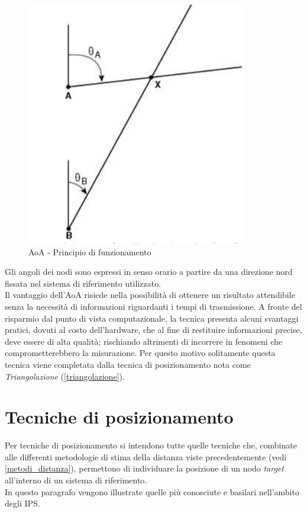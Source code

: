 \begin{figure}[H]  
	\centering 
	\includegraphics[scale=0.8]{ContestoApplicativo/aoa.png}
	\caption{AoA - Principio di funzionamento }
	\label{fig:AoA}
\end{figure}
Gli angoli dei nodi sono espressi in senso orario a partire da una direzione nord fissata nel sistema di riferimento utilizzato.\\
Il vantaggio dell’AoA risiede nella possibilità di ottenere un risultato attendibile senza la necessità di informazioni riguardanti i tempi di trasmissione. A fronte del risparmio dal punto di vista computazionale, la tecnica presenta alcuni svantaggi pratici, dovuti al costo dell’hardware, che al fine di restituire informazioni precise, deve essere di alta qualità; rischiando altrimenti di incorrere in fenomeni che comprometterebbero la misurazione. Per questo motivo solitamente questa tecnica viene completata dalla tecnica di posizionamento nota come \textit{Triangolazione} (\ref{triangolazione}).


\section{Tecniche di posizionamento}
Per tecniche di posizionamento si intendono tutte quelle tecniche che, combinate alle differenti metodologie di stima della distanza viste precedentemente (vedi \ref{metodi_distanza}), permettono di individuare la posizione di un nodo \textit{target} all'interno di un sistema di riferimento.\\
In questo paragrafo vengono illustrate quelle più conosciute e basilari nell'ambito degli IPS.

